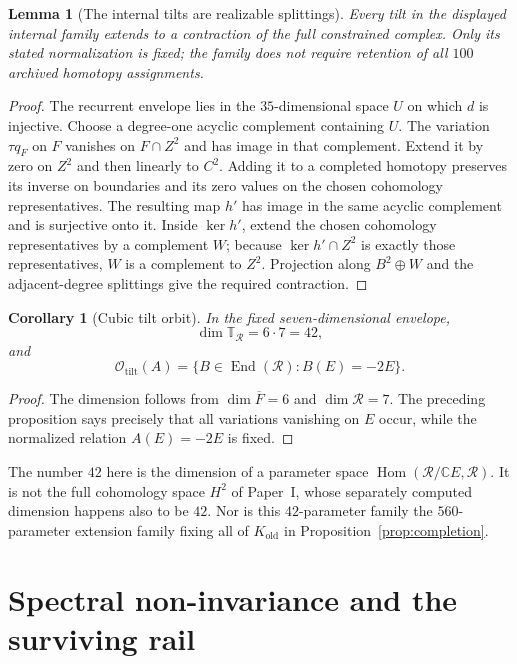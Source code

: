 \documentclass[11pt]{amsart}
\newtheorem{lemma}[theorem]{Lemma}
\newtheorem{corollary}[theorem]{Corollary}
\newcommand{\C}{\mathbb C}
\newcommand{\End}{\operatorname{End}}
\newcommand{\Hom}{\operatorname{Hom}}
\begin{document}
\begin{lemma}[The internal tilts are realizable splittings]
Every tilt in the displayed internal family extends to a contraction of the
full constrained complex. Only its stated normalization is fixed; the family
does not require retention of all $100$ archived homotopy assignments.
\end{lemma}
\begin{proof}
The recurrent envelope lies in the $35$-dimensional space $U$ on which $d$
is injective. Choose a degree-one acyclic complement containing $U$.
The variation $\tau q_F$ on $F$ vanishes on $F\cap Z^2$ and has image in
that complement. Extend it by zero on $Z^2$ and then linearly to $C^2$.
Adding it to a completed homotopy preserves its inverse on boundaries and
its zero values on the chosen cohomology representatives.
The resulting map $h'$ has image in the same acyclic complement and is
surjective onto it. Inside $\ker h'$, extend the chosen cohomology
representatives by a complement $W$; because
$\ker h'\cap Z^2$ is exactly those representatives, $W$ is a complement to
$Z^2$. Projection along $B^2\oplus W$ and the adjacent-degree splittings
give the required contraction.
\end{proof}

\begin{corollary}[Cubic tilt orbit]
In the fixed seven-dimensional envelope,
\[
\dim\mathbb T_{\mathcal R}=6\cdot7=42,
\]
and
\[
\boxed{
\mathcal O_{\mathrm{tilt}}(A)
=\{B\in\End(\mathcal R):B(E)=-2E\}.}
\]
\end{corollary}

\begin{proof}
The dimension follows from \(\dim\overline F=6\) and \(\dim\mathcal R=7\).  The preceding proposition says precisely that all variations vanishing on \(E\) occur, while the normalized relation \(A(E)=-2E\) is fixed.
\end{proof}

The number $42$ here is the dimension of a parameter space
$\Hom(\mathcal R/\C E,\mathcal R)$. It is not the full cohomology space
$H^2$ of Paper~I, whose separately computed dimension happens also to be $42$.
Nor is this $42$-parameter family the $560$-parameter extension family fixing
all of $K_{\mathrm{old}}$ in Proposition~\ref{prop:completion}.

\section{Spectral non-invariance and the surviving rail}
\end{document}
